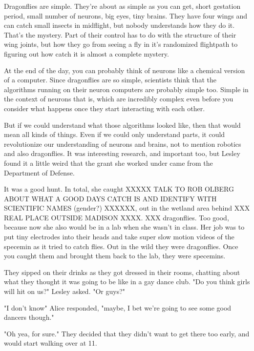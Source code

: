\mypause 

Dragonflies are simple. They're about as simple as you can get, short gestation period, small number of neurons, big eyes, tiny brains. They have four wings and can catch small insects in midflight, but nobody understands how they do it. That's the mystery. Part of their control has to do with the structure of their wing joints, but how they go from seeing a fly in it's randomized flightpath to figuring out how catch it is almost a complete mystery. 

At the end of the day, you can probably think of neurons like a chemical version of a computer. Since dragonflies are so simple, scientists think that the algorithms running on their neuron computers are probably simple too. Simple in the context of neurons that is, which are incredibly complex even before you consider what happens once they start interacting with each other. 

But if we could understand what those algorithms looked like, then that would mean all kinds of things. Even if we could only understand parts, it could revolutionize our understanding of neurons and brains, not to mention robotics and also dragonflies. It was interesting research, and important too, but Lesley found it a little weird that the grant she worked under came from the Department of Defense.

It was a good hunt. In total, she caught XXXXX TALK TO ROB OLBERG ABOUT WHAT A GOOD DAYS CATCH IS AND IDENTIFY WITH SCIENTIFIC NAMES (gender?) XXXXXX, out in the wetland area behind XXX REAL PLACE OUTSIDE MADISON XXXX. XXX dragonflies. Too good, because now she also would be in a lab when she wasn't in class. Her job was to put tiny electrodes into their heads and take super slow motion videos of the specemin as it tried to catch flies. Out in the wild they were dragonflies. Once you caught them and brought them back to the lab, they were specemins. 

\mypause

They sipped on their drinks as they got dressed in their rooms, chatting about what they thought it was going to be like in a gay dance club. "Do you think girls will hit on us?" Lesley asked. "Or guys?" 

"I don't know" Alice responded, "maybe, I bet we're going to see some good dancers though."

"Oh yea, for sure." They decided that they didn't want to get there too early, and would start walking over at 11. 







